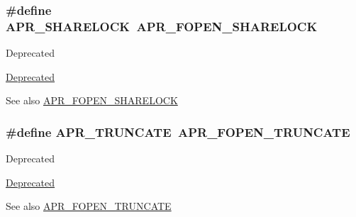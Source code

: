 \subsubsection[{\texorpdfstring{A\+P\+R\+\_\+\+S\+H\+A\+R\+E\+L\+O\+CK}{APR_SHARELOCK}}]{\setlength{\rightskip}{0pt plus 5cm}\#define A\+P\+R\+\_\+\+S\+H\+A\+R\+E\+L\+O\+CK~{\bf A\+P\+R\+\_\+\+F\+O\+P\+E\+N\+\_\+\+S\+H\+A\+R\+E\+L\+O\+CK}}\hypertarget{group__apr__file__open__flags_ga41277154f4f754a22287ed90e9466811}{}\label{group__apr__file__open__flags_ga41277154f4f754a22287ed90e9466811}
\begin{DoxyRefDesc}{Deprecated}
\item[\hyperlink{deprecated__deprecated000034}{Deprecated}]\end{DoxyRefDesc}
\begin{DoxySeeAlso}{See also}
\hyperlink{group__apr__file__open__flags_ga426f6e2a8457ab410d99248269059a18}{A\+P\+R\+\_\+\+F\+O\+P\+E\+N\+\_\+\+S\+H\+A\+R\+E\+L\+O\+CK} 
\end{DoxySeeAlso}
\subsubsection[{\texorpdfstring{A\+P\+R\+\_\+\+T\+R\+U\+N\+C\+A\+TE}{APR_TRUNCATE}}]{\setlength{\rightskip}{0pt plus 5cm}\#define A\+P\+R\+\_\+\+T\+R\+U\+N\+C\+A\+TE~{\bf A\+P\+R\+\_\+\+F\+O\+P\+E\+N\+\_\+\+T\+R\+U\+N\+C\+A\+TE}}\hypertarget{group__apr__file__open__flags_gaa8898fdebd69d3a64286731b713a6dc9}{}\label{group__apr__file__open__flags_gaa8898fdebd69d3a64286731b713a6dc9}
\begin{DoxyRefDesc}{Deprecated}
\item[\hyperlink{deprecated__deprecated000028}{Deprecated}]\end{DoxyRefDesc}
\begin{DoxySeeAlso}{See also}
\hyperlink{group__apr__file__open__flags_ga09b05a5bd5db534b93794f7657bcb146}{A\+P\+R\+\_\+\+F\+O\+P\+E\+N\+\_\+\+T\+R\+U\+N\+C\+A\+TE} 
\end{DoxySeeAlso}
